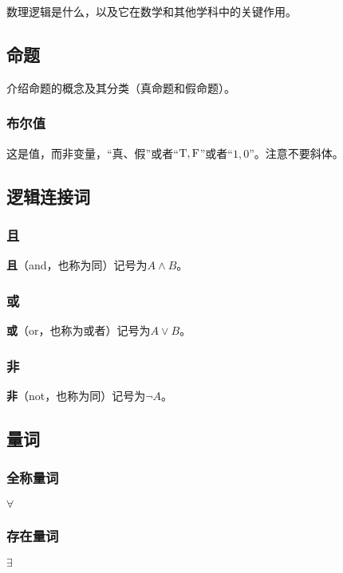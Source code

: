 
\begin{issues}
\issueDraft
\end{issues}
数理逻辑是什么，以及它在数学和其他学科中的关键作用。
\subsection{命题}
介绍命题的概念及其分类（真命题和假命题）。
\subsubsection{布尔值}
这是值，而非变量，“真、假”或者“${\rm T,F}$”或者“$1,0$”。注意不要斜体。
\subsection{逻辑连接词}
\subsubsection{且}
\textbf{且}（and，也称为同）记号为$A\land B$。
\subsubsection{或}
\textbf{或}（or，也称为或者）记号为$A\lor B$。


\subsubsection{非}
\textbf{非}（not，也称为同）记号为$\lnot A$。
\subsection{量词}
\subsubsection{全称量词}
$\forall$
\subsubsection{存在量词}
$\exists$
